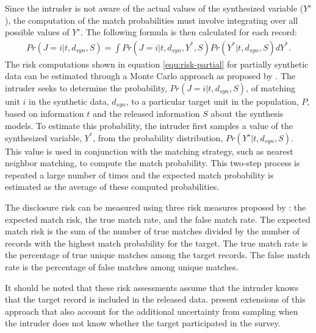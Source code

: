 Since the intruder is not aware of the actual values of the synthesized variable ($Y^{∗}$), the computation of the match probabilities must involve integrating over all possible values of $Y^{∗}$. The following formula is then calculated for each record:
\begin{align}
    \label{equ:risk-partial}
    Pr(J = i|t, d_{syn}, S)=\int Pr(J = i|t, d_{syn}, Y^*,S)Pr(Y^*|t, d_{syn}, S)dY^*.
\end{align}
The risk computations shown in equation \eqref{equ:risk-partial} for partially synthetic data can be estimated through a Monte Carlo approach as proposed by \citet{drechsler2010sampling}. The intruder seeks to determine the probability, $Pr(J = i|t, d_{syn}, S)$, of matching unit $i$ in the synthetic data, $d_{syn}$, to a particular target unit in the population, $P$, based on information $t$ and the released information $S$ about the synthesis models. To estimate this probability, the intruder first samples a value of the synthesized variable, $Y^*$, from the probability distribution, $Pr(Y^∗|t,d_{syn},S)$. This value is used in conjunction with the matching strategy, such as nearest neighbor matching, to compute the match probability. This two-step process is repeated a large number of times and the expected match probability is estimated as the average of these computed probabilities.

The disclosure risk can be measured using three risk measures proposed by \citet{reiter2009estimating}: the expected match risk, the true match rate, and the false match rate. The expected match risk is the sum of the number of true matches divided by the number of records with the highest match probability for the target. The true match rate is the percentage of true unique matches among the target records. The false match rate is the percentage of false matches among unique matches.

It should be noted that these risk assessments assume that the intruder knows that the target record is included in the released data. \citet{drechsler2008accounting} present extensions of this approach that also account for the additional uncertainty from sampling when the intruder does not know whether the target participated in the survey.







